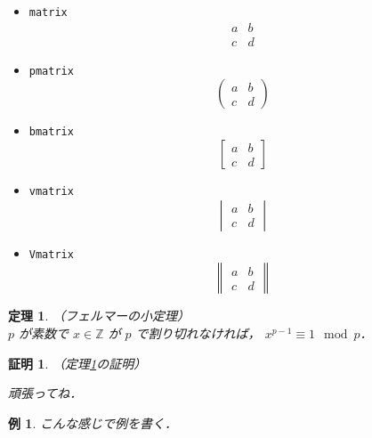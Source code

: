 \documentclass[uplatex]{jsarticle}
\newtheorem{thm}{定理}
\newtheorem{prf}{証明}
\newtheorem{ex}{例}
\begin{document}
\begin{itemize}
    \item \verb|matrix|
    \begin{equation}
    \begin{matrix}
        a & b \\
        c & d 
    \end{matrix}
    \end{equation}
    \item \verb|pmatrix|
    \begin{equation}
    \begin{pmatrix}
        a & b \\
        c & d 
    \end{pmatrix}
    \end{equation}
    \item \verb|bmatrix|
    \begin{equation}
    \begin{bmatrix}
        a & b \\
        c & d 
    \end{bmatrix}
    \end{equation}
    \item \verb|vmatrix|
    \begin{equation}
    \begin{vmatrix}
        a & b \\
        c & d 
    \end{vmatrix}
    \end{equation}
    \item \verb|Vmatrix|
    \begin{equation}
    \begin{Vmatrix}
        a & b \\
        c & d 
    \end{Vmatrix}
    \end{equation}
\end{itemize}

\begin{screen}
    \begin{thm}（フェルマーの小定理）\\
        \label{fermat}
        $p$ が素数で $x \in \mathbb{Z}$ が $p$ で割り切れなければ，
        $x^{p-1} \equiv 1 \mod{p}$．
    \end{thm}
\end{screen}

\begin{prf}
    （定理\ref{fermat}の証明）

    頑張ってね．
\end{prf}

\begin{ex}
    こんな感じで例を書く．
\end{ex}
\end{document}
